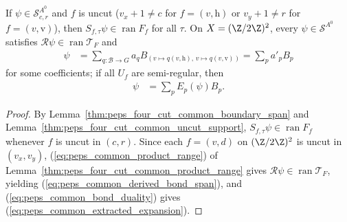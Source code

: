 \begin{lemma}%
    \label{thm:peps_four_cut_common_bond_span}
    \leanok
    If $\psi\in\mathcal S^{A^0}_{c,r}$ and $f$ is uncut ($v_x+1\ne c$ for $f=(v,\mathrm h)$ or $v_y+1\ne r$ for $f=(v,\mathrm v)$), then $S_{f,\tau}\psi\in\operatorname{ran}F_f$ for all $\tau$. On $X=(\Z/2\Z)^2$, every $\psi\in\mathcal S^{A^0}$ satisfies $\mathcal R\psi\in\operatorname{ran}\mathcal T_F$ and
    \begin{align}
        \psi & =\sum_{q:\mathcal B\to G}a_q
        B_{(v\mapsto q(v,\mathrm h),\,v\mapsto q(v,\mathrm v))}
        =\sum_pa'_pB_p
        \label{eq:peps_common_derived_bond_span}
    \end{align}
    for some coefficients; if all $U_f$ are semi-regular, then
    \begin{align}
        \psi & =\sum_pE_p(\psi)B_p.
        \label{eq:peps_common_extracted_expansion}
    \end{align}
\end{lemma}
\begin{proof}\leanok
    By Lemma~\ref{thm:peps_four_cut_common_boundary_span} and Lemma~\ref{thm:peps_four_cut_common_uncut_support}, $S_{f,\tau}\psi\in\operatorname{ran}F_f$ whenever $f$ is uncut in $(c,r)$. Since each $f=(v,d)$ on $(\Z/2\Z)^2$ is uncut in $(v_x,v_y)$, (\ref{eq:peps_common_product_range}) of Lemma~\ref{thm:peps_four_cut_common_product_range} gives $\mathcal R\psi\in\operatorname{ran}\mathcal T_F$, yielding (\ref{eq:peps_common_derived_bond_span}), and (\ref{eq:peps_common_bond_duality}) gives (\ref{eq:peps_common_extracted_expansion}).
\end{proof}

